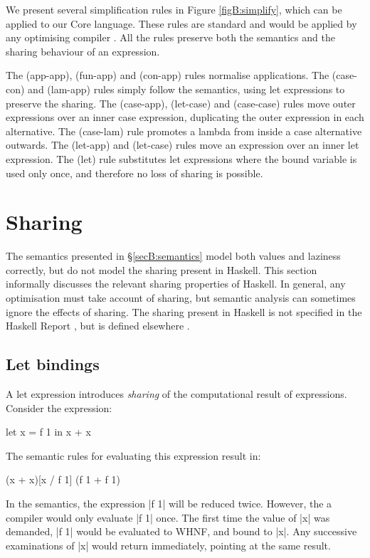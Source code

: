 We present several simplification rules in Figure \ref{figB:simplify}, which can be applied to our Core language. These rules are standard and would be applied by any optimising compiler \cite{spj:transformation}. All the rules preserve both the semantics and the sharing behaviour of an expression.

The (app-app), (fun-app) and (con-app) rules normalise applications. The (case-con) and (lam-app) rules simply follow the semantics, using let expressions to preserve the sharing. The (case-app), (let-case) and (case-case) rules move outer expressions over an inner case expression, duplicating the outer expression in each alternative. The (case-lam) rule promotes a lambda from inside a case alternative outwards. The (let-app) and (let-case) rules move an expression over an inner let expression. The (let) rule substitutes let expressions where the bound variable is used only once, and therefore no loss of sharing is possible.


\section{Sharing}
\label{secB:sharing}

The semantics presented in \S\ref{secB:semantics} model both values and laziness correctly, but do not model the sharing present in Haskell. This section informally discusses the relevant sharing properties of Haskell. In general, any optimisation must take account of sharing, but semantic analysis can sometimes ignore the effects of sharing. The sharing present in Haskell is not specified in the Haskell Report \cite{haskell}, but is defined elsewhere \cite{bakewell:space_semantics}.

\subsection{Let bindings}

A let expression introduces \textit{sharing} of the computational result of expressions. Consider the expression:

\begin{example}
\begin{code}
let x = f 1
in x + x
\end{code}

The semantic rules for evaluating this expression result in:

\begin{code}
(x + x)[x / f 1]
(f 1 + f 1)
\end{code}

In the semantics, the expression |f 1| will be reduced twice. However, the a compiler would only evaluate |f 1| once. The first time the value of |x| was demanded, |f 1| would be evaluated to WHNF, and bound to |x|. Any successive examinations of |x| would return immediately, pointing at the same result.
\end{example}

